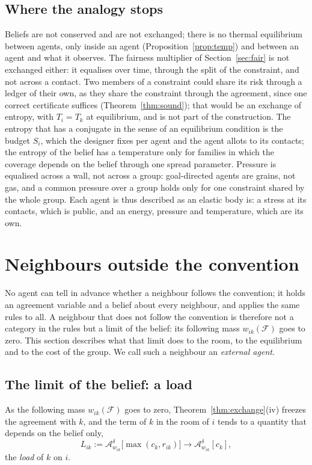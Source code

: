 \documentclass[11pt]{article}
\theoremstyle{definition}
\theoremstyle{remark}
\newcommand{\A}{\mathcal{A}}
\newcommand{\F}{\mathcal{F}}
\begin{document}
\subsection{Where the analogy stops}\label{sec:analogy}
Beliefs are not conserved and are not exchanged; there is no thermal equilibrium between agents, only inside an agent (Proposition~\ref{prop:temp}) and between an agent and what it observes. The fairness multiplier of Section~\ref{sec:fair} is not exchanged either: it equalises over time, through the split of the constraint, and not across a contact. Two members of a constraint could share its risk through a ledger of their own, as they share the constraint through the agreement, since one correct certificate suffices (Theorem~\ref{thm:sound}); that would be an exchange of entropy, with $T_i=T_k$ at equilibrium, and is not part of the construction. The entropy that has a conjugate in the sense of an equilibrium condition is the budget $S_i$, which the designer fixes per agent and the agent allots to its contacts; the entropy of the belief has a temperature only for families in which the coverage depends on the belief through one spread parameter. Pressure is equalised across a wall, not across a group: goal-directed agents are grains, not gas, and a common pressure over a group holds only for one constraint shared by the whole group. Each agent is thus described as an elastic body is: a stress at its contacts, which is public, and an energy, pressure and temperature, which are its own.

\section{Neighbours outside the convention}\label{sec:external}
No agent can tell in advance whether a neighbour follows the convention; it holds an agreement variable and a belief about every neighbour, and applies the same rules to all. A neighbour that does not follow the convention is therefore not a category in the rules but a limit of the belief: its following mass $w_{ik}(\F)$ goes to zero. This section describes what that limit does to the room, to the equilibrium and to the cost of the group. We call such a neighbour an \emph{external agent}.

\subsection{The limit of the belief: a load}
As the following mass $w_{ik}(\F)$ goes to zero, Theorem~\ref{thm:exchange}(iv) freezes the agreement with $k$, and the term of $k$ in the room of $i$ tends to a quantity that depends on the belief only,
\[
L_{ik}:=\A^\delta_{w_{ik}}\big[\max(c_k,r_{ik})\big]\to\A^\delta_{w_{ik}}[c_k],
\]
the \emph{load} of $k$ on $i$.
\end{document}
